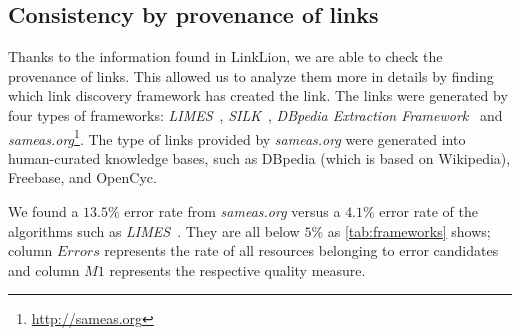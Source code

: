 
\subsection{Consistency by provenance of links}
Thanks to the information found in LinkLion, we are able to check the provenance of links. This allowed us to analyze them more in details by finding which link discovery framework has created the link. The links were generated by four types of frameworks: \textit{LIMES}~\cite{ngomo2011limes}, \textit{SILK}~\cite{volz2009silk},  \textit{DBpedia Extraction Framework}~\cite{lehmann2015dbpedia} and \textit{sameas.org}\footnote{\url{http://sameas.org}}. The type of links provided by \textit{sameas.org} were generated into human-curated knowledge bases, such as DBpedia (which is based on Wikipedia), Freebase, and OpenCyc.

We found a $13.5\%$ error rate from \textit{sameas.org} versus a $4.1\%$ error rate of the algorithms such as \textit{LIMES}~\cite{ngomo2011limes}. They are all below $5\%$ as \cref{tab:frameworks} shows; column $Errors$ represents the rate of all resources belonging to error candidates and column $M1$ represents the respective quality measure. 

